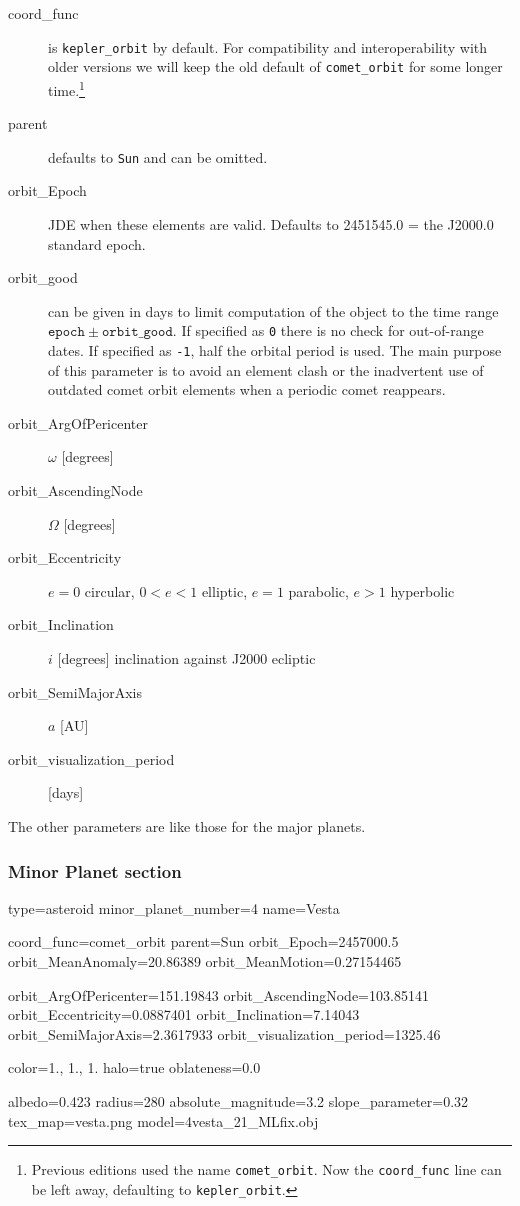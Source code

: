 \begin{description}
\item[coord\_func] is \texttt{kepler\_orbit} by
  default. For compatibility and interoperability
  with older versions we will keep the old default of
  \texttt{comet\_orbit} for some longer time.\footnote{Previous
    editions used the name \texttt{comet\_orbit}. Now the
    \texttt{coord\_func} line can be left away, defaulting to
    \texttt{kepler\_orbit}.}
\item[parent] defaults to \texttt{Sun} and can be omitted.

\item[orbit\_Epoch] JDE when these elements are valid. Defaults to
  2451545.0 = the J2000.0 standard epoch.

\item[orbit\_good] can be given in days to limit computation of the
  object to the time range
  $\mathtt{epoch}\pm\mathtt{orbit\_good}$. If
  specified as \texttt{0} there is no check for out-of-range dates. If
  specified as \texttt{-1}, half the orbital period is used. The main
  purpose of this parameter is to avoid an element clash or the
  inadvertent use of outdated comet orbit elements when a periodic
  comet reappears.

\item[orbit\_ArgOfPericenter] $\omega$ [degrees]
\item[orbit\_AscendingNode] $\Omega$  [degrees]
\item[orbit\_Eccentricity] $e=0$ circular, $0<e<1$ elliptic, $e=1$ parabolic, $e>1$ hyperbolic
\item[orbit\_Inclination] $i$ [degrees] inclination against J2000 ecliptic
\item[orbit\_SemiMajorAxis] $a$ [AU]
\item[orbit\_visualization\_period] [days] %
\end{description}
The other parameters are like those for the major planets. 

\subsubsection{Minor Planet section}
\label{sec:ssystem.ini:MinorPlanet}

\begin{configfile}
[4vesta]
type=asteroid  
minor_planet_number=4
name=Vesta

coord_func=comet_orbit
parent=Sun
orbit_Epoch=2457000.5
orbit_MeanAnomaly=20.86389
orbit_MeanMotion=0.27154465

orbit_ArgOfPericenter=151.19843
orbit_AscendingNode=103.85141
orbit_Eccentricity=0.0887401
orbit_Inclination=7.14043
orbit_SemiMajorAxis=2.3617933
orbit_visualization_period=1325.46

color=1., 1., 1.
halo=true
oblateness=0.0

albedo=0.423
radius=280
absolute_magnitude=3.2
slope_parameter=0.32
tex_map=vesta.png
model=4vesta_21_MLfix.obj
\end{configfile}

